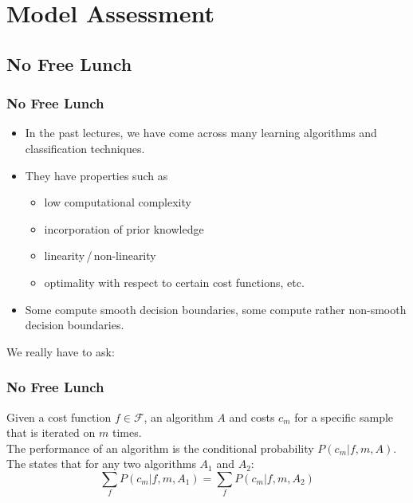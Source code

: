 \def\PS{{\mathop{\mathsf{PS}}}}

\section{Model Assessment}

\subsection{No Free Lunch}

\begin{frame}
  \frametitle{No Free Lunch}

  \begin{itemize}
    \item In the past lectures, we have come across many learning algorithms and classification techniques.
    \item They have properties such as
      \begin{itemize} 
        \item low computational complexity
        \item incorporation of prior knowledge
        \item linearity\,/\,non-linearity
        \item optimality with respect to certain cost functions, etc.
      \end{itemize}
   \item Some compute smooth decision boundaries, some compute rather non-smooth decision boundaries.
  \end{itemize}
  \pspread

  We really have to ask:
  \begin{center}
  \end{center}
\end{frame}


\begin{frame}
  \frametitle{No Free Lunch \cont}

  \begin{theorem}
    Given a cost function $f \in {\mathcal{F}}$, an algorithm $A$ and costs $c_m$ for a specific sample that is iterated on $m$ times.\\[.3cm]
    The performance of an algorithm is the conditional probability $P(c_m | f, m, A)$.\\[.5cm] \pause
    The  states that for any two algorithms $A_1$ and $A_2$:
    \begin{displaymath}
      \sum_f P(c_m | f, m, A_1) = \sum_f P(c_m | f, m, A_2)
    \end{displaymath}
  \end{theorem}
\end{frame}


